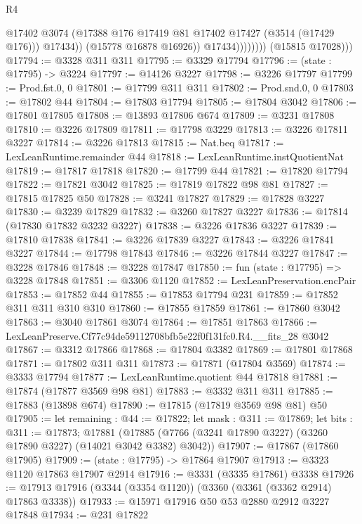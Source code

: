 \begin{lexlean}{R4}
\begin{coremodule}
                              @17402
                              @3074
                              (@17388 @176 @17419 @81 @17402 @17427 (@3514 (@17429 @176)))
                              @17434))
                          (@15778 @16878 @16926))
                        @17434))))))))
        (@15815 @17028)))
@17794 := @3328 @311 @311
@17795 := @3329 @17794
@17796 := (state : @17795) -> @3224
@17797 := @14126 @3227
@17798 := @3226 @17797
@17799 := Prod.fst.{0, 0}
@17801 := @17799 @311 @311
@17802 := Prod.snd.{0, 0}
@17803 := @17802 @44
@17804 := @17803 @17794
@17805 := @17804 @3042
@17806 := @17801 @17805
@17808 := @13893 @17806 @674
@17809 := @3231 @17808
@17810 := @3226 @17809
@17811 := @17798 @3229
@17813 := @3226 @17811 @3227
@17814 := @3226 @17813
@17815 := Nat.beq
@17817 := LexLeanRuntime.remainder @44
@17818 := LexLeanRuntime.instQuotientNat
@17819 := @17817 @17818
@17820 := @17799 @44
@17821 := @17820 @17794
@17822 := @17821 @3042
@17825 := @17819 @17822 @98 @81
@17827 := @17815 @17825 @50
@17828 := @3241 @17827
@17829 := @17828 @3227
@17830 := @3239 @17829
@17832 := @3260 @17827 @3227
@17836 := @17814 (@17830 @17832 @3232 @3227)
@17838 := @3226 @17836 @3227
@17839 := @17810 @17838
@17841 := @3226 @17839 @3227
@17843 := @3226 @17841 @3227
@17844 := @17798 @17843
@17846 := @3226 @17844 @3227
@17847 := @3228 @17846
@17848 := @3228 @17847
@17850 := fun (state : @17795) => @3228 @17848
@17851 := @3306 @1120
@17852 := LexLeanPreservation.encPair
@17853 := @17852 @44
@17855 := @17853 @17794 @231
@17859 := @17852 @311 @311 @310 @310
@17860 := @17855 @17859
@17861 := @17860 @3042
@17863 := @3040 @17861 @3074
@17864 := @17851 @17863
@17866 := LexLeanPreserve.Cf77c94de59112708bfb5e22f0f131fc0.R4.__fits_28 @3042
@17867 := @3312 @17866
@17868 := @17804 @3382
@17869 := @17801 @17868
@17871 := @17802 @311 @311
@17873 := @17871 (@17804 @3569)
@17874 := @3333 @17794
@17877 := LexLeanRuntime.quotient @44 @17818
@17881 := @17874 (@17877 @3569 @98 @81)
@17883 := @3332 @311 @311
@17885 := @17883 (@13898 @674)
@17890 := @17815 (@17819 @3569 @98 @81) @50
@17905 := let remaining : @44 := @17822;
  let mask : @311 := @17869;
  let bits : @311 := @17873;
  @17881 (@17885 (@7766 (@3241 @17890 @3227) (@3260 @17890 @3227) (@14021 @3042 @3382) @3042))
@17907 := @17867 (@17860 @17905)
@17909 := (state : @17795) -> @17864 @17907
@17913 := @3323 @1120 @17863 @17907 @2914
@17916 := @3331 (@3335 @17861) @3338
@17926 := @17913 @17916 (@3344 (@3354 @1120)) (@3360 (@3361 (@3362 @2914) @17863 @3338))
@17933 := @15971 @17916 @50 @53 @2880 @2912 @3227 @17848
@17934 := @231 @17822

\end{coremodule}
\end{lexlean}
